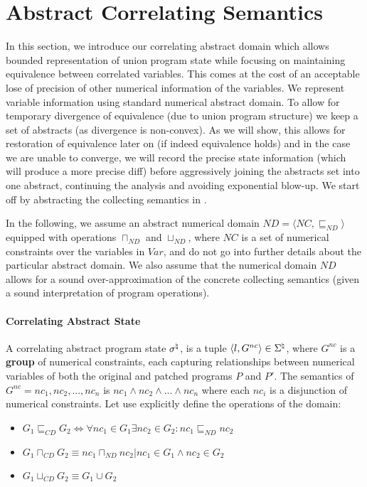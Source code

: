 \section{Abstract Correlating Semantics}
In this section, we introduce our correlating abstract domain which allows bounded representation of union program state while focusing on maintaining equivalence between correlated variables. This comes at the cost of an acceptable lose of precision of other numerical information of the variables. We represent variable information using standard numerical abstract domain. To allow for temporary divergence of equivalence (due to union program structure) we keep a set of abstracts (as divergence is non-convex). As we will show, this allows for restoration of equivalence later on (if indeed equivalence holds) and in the case we are unable to converge, we will record the precise state information (which will produce a more precise diff) before aggressively joining the abstracts set into one abstract, continuing the analysis and avoiding exponential blow-up. We start off by abstracting the collecting semantics in .

In the following, we assume an abstract numerical domain $ND = \langle NC, \sqsubseteq_{ND} \rangle$ equipped with operations
$\sqcap_{ND}$ and $\sqcup_{ND}$, where $NC$ is a set of numerical constraints over the variables in $Var$, and do not go into further details about the particular abstract domain. We also assume that the numerical domain $ND$ allows for a sound over-approximation of the concrete collecting semantics (given a sound interpretation of program operations).

\paragraph{Correlating Abstract State} 
A correlating abstract program state $\sigma^\natural$, is a tuple $\langle l, G^{nc} \rangle \in \Sigma^\natural$, where $G^{nc}$ is a \textbf{group} of numerical constraints, each capturing relationships between numerical variables of both the original and patched programs $P$ and $P'$. The semantics of $G^{nc} = {nc_1,nc_2,...,nc_n}$ is $nc_1\wedge nc_2 \wedge ... \wedge nc_n$ where each $nc_i$ is a disjunction of numerical constraints. Let use explicitly define the operations of the domain:
\begin{itemize}
\item $G_1 \sqsubseteq_{CD} G_2 \Longleftrightarrow \forall nc_1 \in G_1 \exists nc_2 \in G_2 : nc_1 \sqsubseteq_{ND} nc_2$
\item $G_1 \sqcap_{CD} G_2 \equiv { nc_1 \sqcap_{ND} nc_2 | nc_1 \in G_1 \wedge nc_2 \in G_2}$
\item $G_1 \sqcup_{CD} G_2 \equiv G_1 \cup G_2$
\end{itemize}

